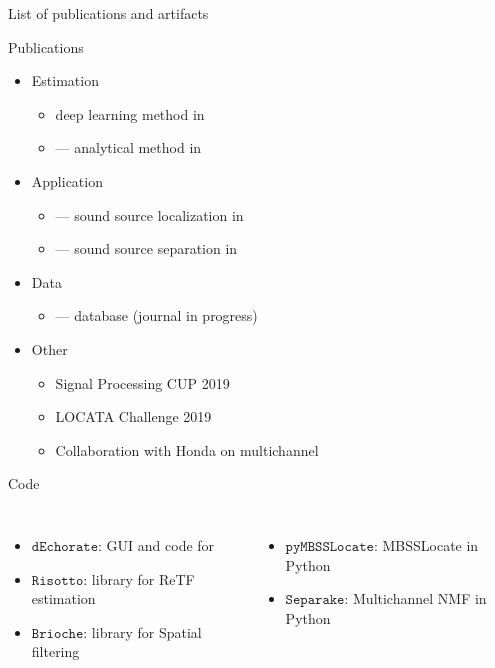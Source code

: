\begin{frame}{List of publications and artifacts}
    \begin{block}{Publications}
    \begin{itemize}
        \item Estimation
        \begin{itemize}\small
            \item deep learning method in~\cite{di2019mirage}
            \item \blaster --- analytical method in~\cite{di2020blaster}
        \end{itemize}
        \item Application
        \begin{itemize}\small
            \item \mirage --- sound source localization in~\cite{di2019mirage}
            \item \separake --- sound source separation in~\cite{scheibler2018separake}
        \end{itemize}
        \item Data
        \begin{itemize}\small
            \item \dechorate --- database (journal in progress)
        \end{itemize}
        \item Other
        \begin{itemize}\small
            \item Signal Processing CUP 2019 \cite{deleforge2019audio}
            \item LOCATA Challenge 2019 \cite{lebarbenchon2018evaluation}
            \item Collaboration with Honda on multichannel \mirage
        \end{itemize}
    \end{itemize}
    \end{block}

    \begin{block}{Code}
        \begin{columns}[T,onlytextwidth]
            \begin{itemize}\small
                \item $\mathtt{dEchorate}$: GUI and code for \dechorate
                \item $\mathtt{Risotto}$: library for ReTF estimation
                \item $\mathtt{Brioche}$: library for Spatial filtering
            \end{itemize}

            \begin{itemize}\small
                \item $\mathtt{pyMBSSLocate}$: MBSSLocate in Python
                \item $\mathtt{Separake}$: Multichannel NMF in Python
            \end{itemize}
        \end{columns}
    \end{block}

    \hfill{}
\end{frame}